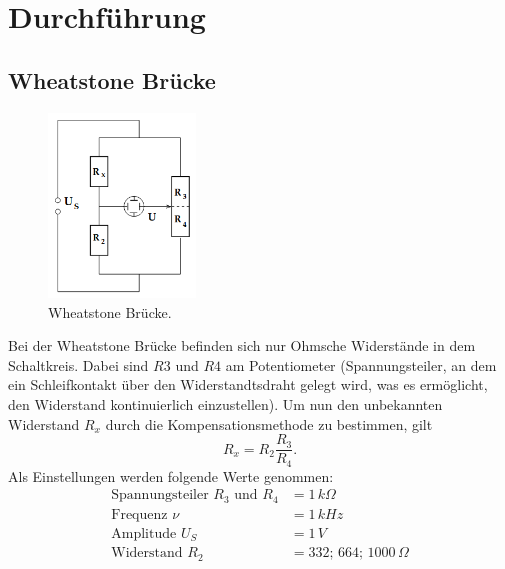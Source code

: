 \section{Durchführung}
\label{sec:Durchführung}

\subsection{Wheatstone Brücke}
\begin{figure}[H]
    \centering
        \centering
        \includegraphics[width=0.35\textwidth]{Bilder/wheatstone.png}
        \caption{Wheatstone Brücke. \cite{anleitung}}
    \hfill
    \label{fig:f2}
\end{figure}
\noindent Bei der Wheatstone Brücke befinden sich nur Ohmsche Widerstände in 
dem Schaltkreis. Dabei sind $R3$ und $R4$ am Potentiometer (Spannungsteiler, 
an dem ein Schleifkontakt über den Widerstandtsdraht gelegt wird, was es
ermöglicht, den Widerstand kontinuierlich einzustellen). Um nun den unbekannten 
Widerstand $R_x$ durch die Kompensationsmethode zu bestimmen, gilt
\begin{equation}
    \label{eqn:1}
    R_x = R_2 \frac{R_3}{R_4}.
\end{equation}
\noindent Als Einstellungen werden folgende Werte genommen:
\begin{align*}
    \label{eqn:werte1}
    \text{Spannungsteiler } R_3 \text{ und } R_4 &= 1\,k\Omega \\
    \text{Frequenz } \nu &= 1\,kHz \\
    \text{Amplitude } U_S &= 1\,V \\
    \text{Widerstand } R_2 &= 332;\, 664;\, 1000\,\Omega \\
\end{align*}


